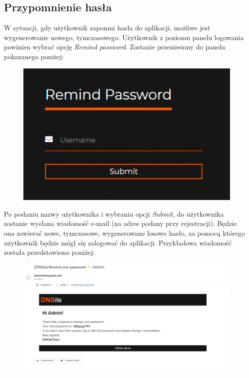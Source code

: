 \documentclass[12pt] {article}
\begin{document}
\subsection{Przypomnienie hasła}
W sytuacji, gdy użytkownik zapomni hasła do aplikacji, możliwe jest wygenerowanie nowego, tymczasowego. Użytkownik z poziomu panelu logowania powinien wybrać opcję \emph{Remind password}. Zostanie przeniesiony do panelu pokazanego poniżej:
\begin{figure}[H]
\centering
\includegraphics[scale = 1]{res/4_nowe_haslo}
\end{figure}
Po podaniu nazwy użytkownika i wybraniu opcji \emph{Submit}, do użytkownika zostanie wysłana wiadomość e-mail (na adres podany przy rejestracji). Będzie ona zawierać nowe, tymczasowe, wygenerowane losowo hasło, za pomocą którego użytkownik będzie mógł się zalogować do aplikacji. Przykładowa wiadomość została przedstawiona poniżej:
\begin{figure}[H]
\centering
\includegraphics[width=\textwidth]{res/5_mail_haslo}
\end{figure}
\end{document}
